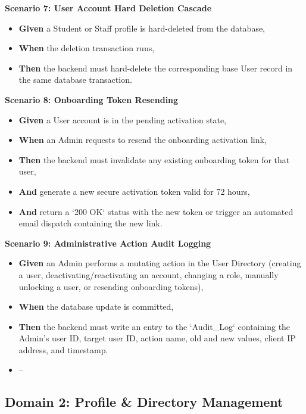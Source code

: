 \noindent\textbf{Scenario 7: User Account Hard Deletion Cascade}\\
\begin{itemize}
  \item \textbf{Given} a Student or Staff profile is hard-deleted from the database,
  \item \textbf{When} the deletion transaction runs,
  \item \textbf{Then} the backend must hard-delete the corresponding base User record in the same database transaction.
\end{itemize}


\noindent\textbf{Scenario 8: Onboarding Token Resending}\\
\begin{itemize}
  \item \textbf{Given} a User account is in the pending activation state,
  \item \textbf{When} an Admin requests to resend the onboarding activation link,
  \item \textbf{Then} the backend must invalidate any existing onboarding token for that user,
  \item \textbf{And} generate a new secure activation token valid for 72 hours,
  \item \textbf{And} return a `200 OK` status with the new token or trigger an automated email dispatch containing the new link.
\end{itemize}


\noindent\textbf{Scenario 9: Administrative Action Audit Logging}\\
\begin{itemize}
  \item \textbf{Given} an Admin performs a mutating action in the User Directory (creating a user, deactivating/reactivating an account, changing a role, manually unlocking a user, or resending onboarding tokens),
  \item \textbf{When} the database update is committed,
  \item \textbf{Then} the backend must write an entry to the `Audit\_Log` containing the Admin's user ID, target user ID, action name, old and new values, client IP address, and timestamp.
\end{itemize}

\begin{itemize}
  \item --
\end{itemize}

\subsection{Domain 2: Profile \& Directory Management}


